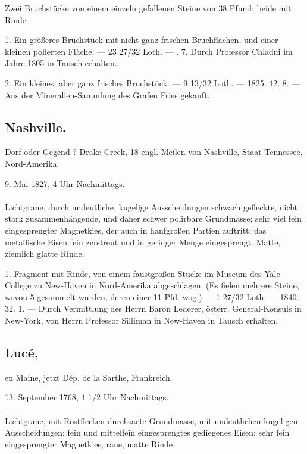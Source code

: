\documentclass[a4paper, 11pt, oneside, polutonikogreek, german]{article}
\begin{document}
Zwei Bruchstücke von einem einzeln gefallenen Steine von 38 Pfund; beide mit Rinde.

1. Ein größeres Bruchstück mit nicht ganz frischen Bruchflächen, und einer kleinen polierten Fläche. — 23 27/32 Loth. — . 7. Durch Professor Chladni im Jahre 1805 in Tausch erhalten.

2. Ein kleines, aber ganz frisches Bruchstück. — 9 13/32 Loth. — 1825. 42. 8. — Aus der Mineralien-Sammlung des Grafen Fries gekauft.
\subsection{Nashville.}
\begin{center}
\small
Dorf oder Gegend ? Drake-Creek, 18 engl. Meilen von Nashville, Staat Tennessee, Nord-Amerika.

9. Mai 1827, 4 Uhr Nachmittags.
\end{center}
\paragraph{}
Lichtgrane, durch undeutliche, kugelige Ausscheidungen schwach gefleckte, nicht stark zusammenhängende, und daher schwer polirbare Grundmasse; sehr viel fein eingesprengter Magnetkies, der auch in hanfgroßen Partien auftritt; das metallische Eisen fein zerstreut und in geringer Menge eingesprengt. Matte, ziemlich glatte Rinde.

1. Fragment mit Rinde, von einem faustgroßen Stücke im Museum des Yale-College zu New-Haven in Nord-Amerika abgeschlagen. (Es fielen mehrere Steine, wovon 5 gesammelt wurden, deren einer 11 Pfd. wog.) — 1 27/32 Loth. — 1840. 32. 1. — Durch Vermittlung des Herrn Baron Lederer, österr. General-Konsuls in New-York, von Herrn Professor Silliman in New-Haven in Tausch erhalten.
\subsection[Lucé.]{Lucé,}
\begin{center}
\small
en Maine, jetzt Dép. de la Sarthe, Frankreich.

13. September 1768, 4 1/2 Uhr Nachmittags.
\end{center}
\paragraph{}
Lichtgraue, mit Rostflecken durchsäete Grundmasse, mit undeutlichen kugeligen Ausscheidungen; fein und mittelfein eingesprengtes gediegenes Eisen; sehr fein eingesprengter Magnetkies; raue, matte Rinde.
\end{document}
